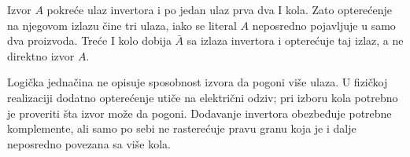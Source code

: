 
Izvor \(A\) pokreće ulaz invertora i po jedan ulaz prva dva I kola. Zato opterećenje na njegovom izlazu čine tri ulaza, iako se literal \(A\) neposredno pojavljuje u samo dva proizvoda. Treće I kolo dobija \(\bar A\) sa izlaza invertora i opterećuje taj izlaz, a ne direktno izvor \(A\).

Logička jednačina ne opisuje sposobnost izvora da pogoni više ulaza. U fizičkoj realizaciji dodatno opterećenje utiče na električni odziv; pri izboru kola potrebno je proveriti šta izvor može da pogoni. Dodavanje invertora obezbeđuje potrebne komplemente, ali samo po sebi ne rasterećuje pravu granu koja je i dalje neposredno povezana sa više kola.
